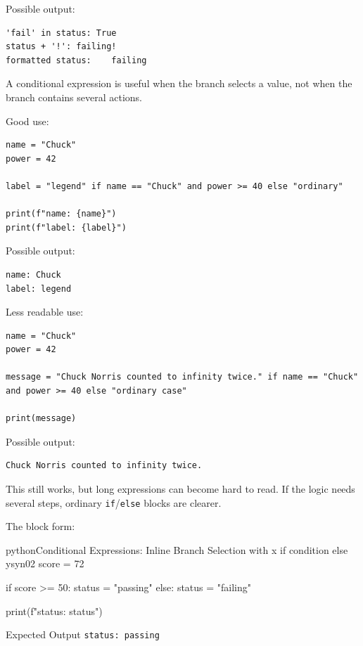 Possible output:

\begin{verbatim}
'fail' in status: True
status + '!': failing!
formatted status:    failing
\end{verbatim}

A conditional expression is useful when the branch selects a value, not when the branch contains several actions.

Good use:

\begin{verbatim}
name = "Chuck"
power = 42

label = "legend" if name == "Chuck" and power >= 40 else "ordinary"

print(f"name: {name}")
print(f"label: {label}")
\end{verbatim}

Possible output:

\begin{verbatim}
name: Chuck
label: legend
\end{verbatim}

Less readable use:

\begin{verbatim}
name = "Chuck"
power = 42

message = "Chuck Norris counted to infinity twice." if name == "Chuck" and power >= 40 else "ordinary case"

print(message)
\end{verbatim}

Possible output:

\begin{verbatim}
Chuck Norris counted to infinity twice.
\end{verbatim}

This still works, but long expressions can become hard to read. If the logic needs several steps, ordinary \texttt{if}/\texttt{else} blocks are clearer.

The block form:

\begin{codebox}[]{python}{Conditional Expressions: Inline Branch Selection with x if condition else y}{syn02}
score = 72

if score >= 50:
    status = "passing"
else:
    status = "failing"

print(f"status: {status}")
\end{codebox}


\begin{iobox}{Expected Output}
\texttt{status: passing} \\
\end{iobox}


